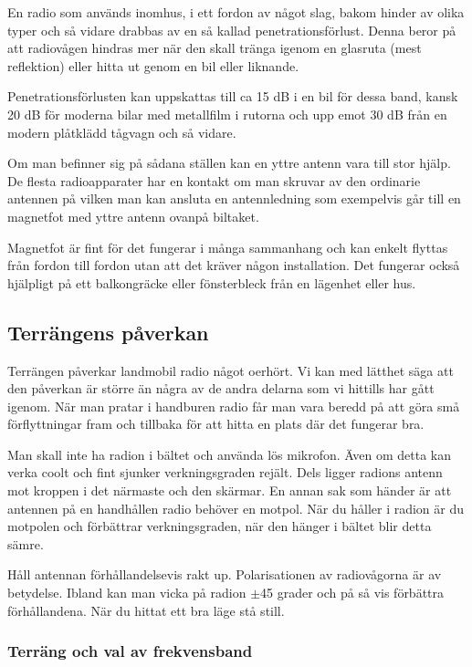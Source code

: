 \documentclass[12ypt,swedish,a4paper]{report}
\begin{document}
En radio som används inomhus, i ett fordon av något slag, bakom hinder av olika typer och så vidare drabbas av en så kallad penetrationsförlust. Denna beror på att radiovågen hindras mer när den skall tränga igenom en glasruta (mest reflektion) eller hitta ut genom en bil eller liknande. 

Penetrationsförlusten kan uppskattas till ca 15 dB i en bil för dessa band, kansk 20 dB för moderna bilar med metallfilm i rutorna och upp emot 30 dB från en modern plåtklädd tågvagn och så vidare.

Om man befinner sig på sådana ställen kan en yttre antenn vara till stor hjälp. De flesta radioapparater har en kontakt om man skruvar av den ordinarie antennen på vilken man kan ansluta en antennledning som exempelvis går till en magnetfot med yttre antenn ovanpå biltaket.

Magnetfot är fint för det fungerar i många sammanhang och kan enkelt flyttas från fordon till fordon utan att det kräver någon installation. Det fungerar också hjälpligt på ett balkongräcke eller fönsterbleck från en lägenhet eller hus.


\subsection{Terrängens påverkan}

Terrängen påverkar landmobil radio något oerhört. Vi kan med lätthet säga att den påverkan är större än några av de andra delarna som vi hittills har gått igenom. När man pratar i handburen radio får man vara beredd på att göra små förflyttningar fram och tillbaka för att hitta en plats där det fungerar bra.

Man skall inte ha radion i bältet och använda lös mikrofon. Även om detta kan verka coolt och fint sjunker verkningsgraden rejält. Dels ligger radions antenn mot kroppen i det närmaste och den skärmar. En annan sak som händer är att antennen på en handhållen radio behöver en motpol. När du håller i radion är du motpolen och förbättrar verkningsgraden, när den hänger i bältet blir detta sämre.

Håll antennan förhållandelsevis rakt up. Polarisationen av radiovågorna är av betydelse. Ibland kan man vicka på radion $\pm$45 grader och på så vis förbättra förhållandena. När du hittat ett bra läge stå still.

\subsubsection{Terräng och val av frekvensband}
\end{document}
